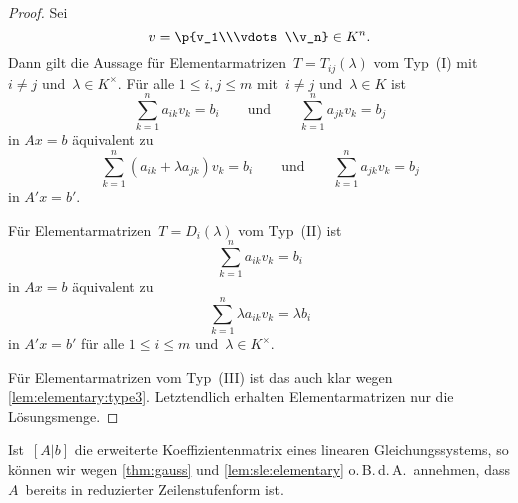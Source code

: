 \documentclass[a4paper]{article}
\begin{document}
\begin{proof}
    Sei
    \begin{equation*}
        v = \p{v_1\\\vdots\\v_n} \in K^n.
    \end{equation*}
    Dann gilt die Aussage für Elementarmatrizen~$T = T_{ij}(\lambda)$ vom Typ~(I) mit~$i \neq j$ und~$\lambda \in K^\times$. Für alle $1 \leq i,j \leq m$ mit~$i \neq j$ und~$\lambda \in K$ ist
    \begin{equation*}
        \sum_{k=1}^n a_{ik}v_k = b_i \qquad\text{und}\qquad \sum_{k=1}^n a_{jk}v_k = b_j
    \end{equation*}
    in $Ax = b$ äquivalent zu
    \begin{equation*}
        \sum_{k=1}^n (a_{ik} + \lambda a_{jk}) v_k = b_i \qquad\text{und}\qquad \sum_{k=1}^n a_{jk}v_k = b_j
    \end{equation*}
    in $A'x = b'$.

    Für Elementarmatrizen~$T = D_i(\lambda)$ vom Typ~(II) ist
    \begin{equation*}
        \sum_{k=1}^n a_{ik}v_k = b_i
    \end{equation*}
    in $Ax = b$ äquivalent zu
    \begin{equation*}
        \sum_{k=1}^n \lambda a_{ik}v_k = \lambda b_i
    \end{equation*}
    in $A'x = b'$ für alle $1 \leq i \leq m$ und~$\lambda \in K^\times$.

    Für Elementarmatrizen vom Typ~(III) ist das auch klar wegen \cref{lem:elementary:type3}. Letztendlich erhalten Elementarmatrizen nur die Lösungsmenge.
\end{proof}

\begin{remark}
    Ist~$[A|b]$ die erweiterte Koeffizientenmatrix eines linearen Gleichungssystems, so können wir wegen \ref{thm:gauss} und \cref{lem:sle:elementary} o.\,B.\,d.\,A.\ annehmen, dass $A$~bereits in reduzierter Zeilenstufenform ist.
\end{remark}
\end{document}
